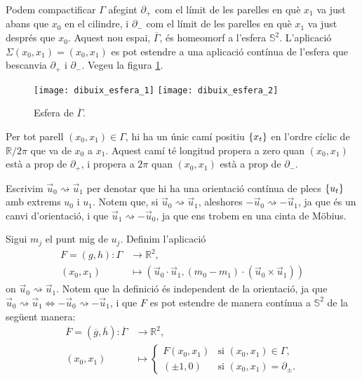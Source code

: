 Podem compactificar $\Gamma$ afegint $\partial_+$ com el límit de les parelles en què $x_1$ va just abans que $x_0$ en el cilindre, i $\partial_-$ com el límit de les parelles en què $x_1$ va just després que $x_0$. Aquest nou espai, $\overline{\Gamma}$, és homeomorf a l'esfera $\mathbb S^2$. L'aplicació $\Sigma(x_0,x_1) = (x_0,x_1)$ es pot estendre a una aplicació contínua de l'esfera que bescanvia $\partial_+$ i $\partial_-$. Vegeu la figura \ref{fig:esfera}.

\begin{figure}[htbp]
    \centering
    \texttt{[image: dibuix\_esfera\_1]}
    \raisebox{5\height}{$\quad\quad\Large\cong\quad$}
    \texttt{[image: dibuix\_esfera\_2]}
    \caption{Esfera de $\overline{\Gamma}$.}
    \label{fig:esfera}
\end{figure}

Per tot parell $(x_0,x_1)\in{\Gamma}$, hi ha un únic camí positiu $\{x_t\}$ en l'ordre cíclic de $\mathbb R/2\pi$ que va de $x_0$ a $x_1$. Aquest camí té longitud propera a zero quan $(x_0,x_1)$ està a prop de $\partial_+$, i propera a $2\pi$ quan $(x_0,x_1)$ està a prop de $\partial_-$.

Escrivim $\vec u_0\rightsquigarrow\vec u_1$ per denotar que hi ha una orientació contínua de plecs $\{u_t\}$ amb extrems $u_0$ i $u_1$. Notem que, si $\vec u_0\rightsquigarrow\vec u_1$, aleshores $-\vec u_0\rightsquigarrow-\vec u_1$, ja que és un canvi d'orientació, i que $\vec u_1\rightsquigarrow-\vec u_0$, ja que ens trobem en una cinta de Möbius. 

Sigui $m_j$ el punt mig de $u_j$. Definim l'aplicació
\begin{align*}
    F=(g,h): {\Gamma}&\to\mathbb R^2,\\
    (x_0,x_1)&\mapsto(\vec u_0\cdot\vec u_1, (m_0- m_1)\cdot(\vec u_0\times\vec u_1))
\end{align*}
on $\vec u_0\rightsquigarrow\vec u_1$. Notem que la definició és independent de la orientació, ja que $\vec u_0\rightsquigarrow\vec u_1\iff-\vec u_0\rightsquigarrow-\vec u_1$, i que $F$ es pot estendre de manera contínua a $\mathbb S^2$ de la següent manera:
\begin{align*}
    \overline{F}=(\overline{g},\overline{h}): \overline{\Gamma}&\to\mathbb R^2,\\
    (x_0,x_1)&\mapsto\begin{cases}
        F(x_0,x_1) & \text{si } (x_0,x_1)\in{\Gamma},\\
        (\pm 1,0) & \text{si } (x_0,x_1)={\partial_\pm}.
    \end{cases}
\end{align*}


